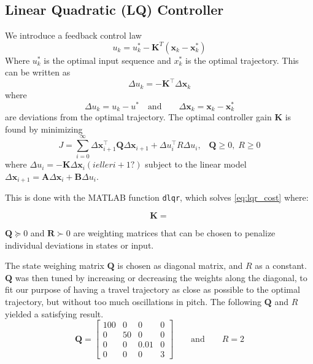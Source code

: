\documentclass[11pt,a4paper,USenglish]{article} %
\begin{document}
\subsection{Linear Quadratic (LQ) Controller}
We introduce a feedback control law
\begin{equation}
    u_k = u_k^* - \mathbf{K}^T(\mathbf{x}_k - \mathbf{x}_k^*)
\end{equation}
Where $u_k^*$ is the optimal input sequence and $x_k^*$ is the optimal trajectory. This can be written as
\begin{equation}
\label{eq:delta_uk}
\Delta u_k = -\mathbf{K}^\top \Delta \mathbf{x}_k
\end{equation}
where
\begin{equation}
\Delta u_k = u_k - u^*\quad \text{and} \qquad \Delta \mathbf{x}_k = \mathbf{x}_k - \mathbf{x}^*_k
\end{equation}
are deviations from the optimal trajectory.
The optimal controller gain $\mathbf{K}$ is found by minimizing 
\begin{equation}
    \label{eq:lqr_cost}
    J = \sum_{i=0}^\infty {\Delta \mathbf{x}_{i+1}^\top \mathbf{Q} \Delta \mathbf{x}_{i+1} + \Delta u_{i}^\top R\Delta u_{i}}, \;\;\; \mathbf{Q} \geq 0, \; R \geq 0
\end{equation}
where $\Delta u_i = -\mathbf{K} \Delta \mathbf{x}_{i} (i eller i+1?)$ subject to the linear model $\Delta \mathbf{x}_{i+1} = \mathbf{A}\Delta \mathbf{x}_i + \mathbf{B}\Delta u_i$.

This is done with the MATLAB function \verb!dlqr!, which solves \eqref{eq:lqr_cost} where:

\begin{equation}
	\label{eq_ricattiK}
    \mathbf{K} =     
\end{equation}

$\mathbf{Q} \succeq 0$ and $\mathbf{R} \succ 0$ are weighting matrices that can be chosen to penalize individual deviations in states or input.


The state weighing matrix $\mathbf{Q}$ is chosen as diagonal matrix, and $R$ as a constant. $\mathbf{Q}$ was then tuned by increasing or decreasing the weights along the diagonal, to fit our purpose of having a travel trajectory as close as
possible to the optimal trajectory, but without too much oscillations in pitch. The following $\mathbf{Q}$ and $R$ yielded a satisfying result.
\begin{equation}
    \mathbf{Q} = \begin{bmatrix} 100 & 0 & 0 & 0 \\ 0 & 50 & 0 & 0 \\ 0 & 0 & 0.01 & 0 \\ 0 & 0 & 0 & 3 \end{bmatrix}
    \qquad\text{and}\qquad
    R = 2
\end{equation}
\end{document}

